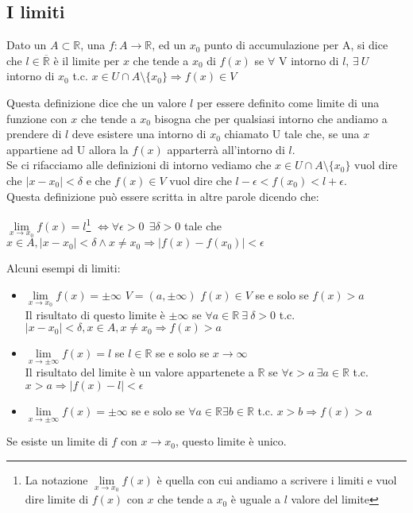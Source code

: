 \subsection{I limiti}
\begin{definition}[Limite]
    Dato un $A \subset \mathbb{R}$, una $f: A \longrightarrow \mathbb{R}$, ed un $x_0$ punto di accumulazione per A, si dice che $l \in \overline{\mathbb{R}}$ è il limite per $x$ che tende a $x_0$ di $f(x)$ se $\forall$ V intorno di $l$, $\exists \: U$ intorno di $x_0$ t.c. $x \in U \cap A \setminus \{x_0\} \Longrightarrow f(x) \in V$
\end{definition}
Questa definizione dice che un valore $l$ per essere definito come limite di una funzione con $x$ che tende a $x_0$ bisogna che per qualsiasi intorno che andiamo a prendere di $l$ deve esistere una intorno di $x_0$ chiamato U tale che, se una $x$ appartiene ad U allora la $f(x)$ apparterrà all'intorno di $l$. \\
Se ci rifacciamo alle definizioni di intorno vediamo che $x \in U \cap A \setminus \{x_0\}$ vuol dire che $|x-x_0| < \delta$ e che $f(x) \in V $ vuol dire che $l - \epsilon < f(x_0) < l + \epsilon$.\\
Questa definizione può essere scritta in altre parole dicendo che:
\begin{center}
    $\lim\limits_{x\to x_0}f(x) = l$\footnote{La notazione $\lim\limits_{x\to x_0}f(x)$ è quella con cui andiamo a scrivere i limiti e vuol dire limite di $f(x)$ con $x$ che tende a $x_0$ è uguale a $l$ valore del limite} $ \Longleftrightarrow \forall \epsilon > 0 \: \: \exists \delta > 0 $ tale che $x \in A, |x - x_0| < \delta \land x \neq x_0 \Longrightarrow |f(x) - f(x_0)| < \epsilon$
\end{center}
\begin{example}
Alcuni esempi di limiti:
\begin{itemize}
    \item $\lim\limits_{x\to x_0}f(x) = \pm \infty$ \hspace{.5cm} $V = (a, \pm \infty)$ \hspace{.5cm} $f(x) \in V$ se e solo se $f(x) > a$\\
    Il risultato di questo limite è $\pm \infty$ se $\forall a \in \mathbb{R} \: \exists \: \delta > 0$ t.c. $|x-x_0|<\delta, x \in A, x\neq x_0 \Longrightarrow f(x) > a$
    \item $\lim\limits_{x\to \pm \infty}f(x) = l$ \hspace{.5cm} se $l \in \mathbb{R}$ se e solo se $x \to \infty$\\
    Il risultato del limite è un valore appartenete a $\mathbb{R}$ se $\forall \epsilon > a \: \exists a \in \mathbb{R}$ t.c. $x > a \Longrightarrow |f(x) - l| < \epsilon$
    \item $\lim\limits_{x\to \pm \infty}f(x) = \pm \infty$ \:
    se e solo se $\forall a \in \mathbb{R} \exists b \in \mathbb{R}$ t.c. $x > b \Longrightarrow f(x) > a$
\end{itemize}
\end{example}
\begin{theorem}
Se esiste un limite di $f$ con $x \to x_0$, questo limite è unico.
\end{theorem}

